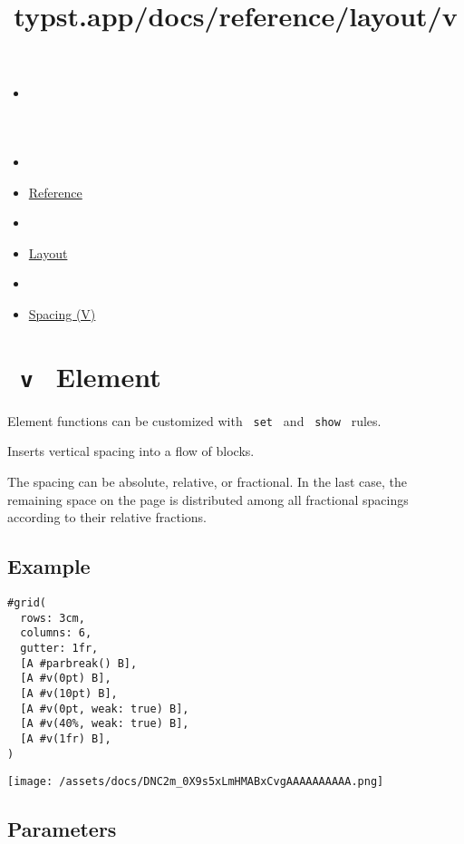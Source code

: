\title{typst.app/docs/reference/layout/v}

\begin{itemize}
\tightlist
\item
  \href{/docs}{}
\item
  
\item
  \href{/docs/reference/}{Reference}
\item
  
\item
  \href{/docs/reference/layout/}{Layout}
\item
  
\item
  \href{/docs/reference/layout/v/}{Spacing (V)}
\end{itemize}

\section{\texorpdfstring{\texttt{\ v\ } {{ Element
}}}{ v   Element }}\label{summary}

\label{element-tooltip}
Element functions can be customized with \texttt{\ set\ } and
\texttt{\ show\ } rules.

Inserts vertical spacing into a flow of blocks.

The spacing can be absolute, relative, or fractional. In the last case,
the remaining space on the page is distributed among all fractional
spacings according to their relative fractions.

\subsection{Example}\label{example}

\begin{verbatim}
#grid(
  rows: 3cm,
  columns: 6,
  gutter: 1fr,
  [A #parbreak() B],
  [A #v(0pt) B],
  [A #v(10pt) B],
  [A #v(0pt, weak: true) B],
  [A #v(40%, weak: true) B],
  [A #v(1fr) B],
)
\end{verbatim}

\texttt{[image: /assets/docs/DNC2m\_0X9s5xLmHMABxCvgAAAAAAAAAA.png]}

\subsection{\texorpdfstring{{ Parameters
}}{ Parameters }}\label{parameters}

